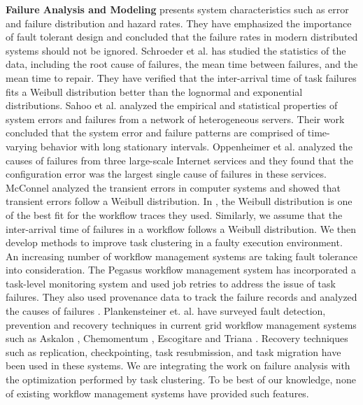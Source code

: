 \textbf{Failure Analysis and Modeling} \cite{Tang1990} presents system characteristics such as error and failure distribution and hazard rates. They have emphasized the importance of fault tolerant design and concluded that the failure rates in modern distributed systems should not be ignored. Schroeder et al. \cite{Schroeder2006} has studied the statistics of the data, including the root cause of failures, the mean time between failures, and the mean time to repair.  They have verified that the inter-arrival time of task failures fits a Weibull distribution better than the lognormal and exponential distributions. Sahoo et al. \cite{Sahoo2004} analyzed the empirical and statistical properties of system errors and failures from a network of heterogeneous servers. Their work concluded that the system error and failure patterns are comprised of time-varying behavior with long stationary intervals.
Oppenheimer et al. \cite{Oppenheimer2002} analyzed the causes of failures from three large-scale Internet services and they found that the configuration error was the largest single cause of failures in these services. McConnel \cite{McConnel1979} analyzed the transient errors in computer systems and showed that transient errors follow a Weibull distribution. In \cite{Sun2003, Iosup2008}, the Weibull distribution is one of the best fit for the workflow traces they used.  Similarly, we assume that the inter-arrival time of failures in a workflow follows a Weibull distribution. We then develop methods to improve task clustering in a faulty execution environment.  
An increasing number of workflow management systems are taking fault tolerance into consideration. The Pegasus workflow management system \cite{Deelman2004} has incorporated a task-level monitoring system and used job retries to address the issue of task failures. They also used provenance data to track the failure records and analyzed the causes of failures \cite{Samak2011}. Plankensteiner et. al. \cite{plankensteiner2009fault} have surveyed fault detection, prevention and recovery techniques in current grid workflow management systems such as Askalon \cite{fahringer2007askalon}, Chemomentum \cite{schuller2008chemomentum}, Escogitare \cite{laforenza2007biological} and Triana \cite{taylor2007triana}. Recovery techniques such as replication, checkpointing, task resubmission, and task migration have been used in these systems. We are integrating the work on failure analysis with the optimization performed by task clustering. To be best of our knowledge, none of existing workflow management systems have provided such features. 

